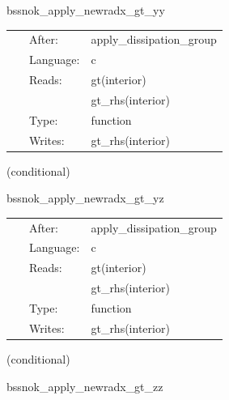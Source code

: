 \hspace{5mm} bssnok\_apply\_newradx\_gt\_yy 



\hspace{5mm}

 \begin{tabular*}{160mm}{cll} 
~ & After:  & apply\_dissipation\_group \\ 
~ & Language:  & c \\ 
~ & Reads:  & gt(interior) \\ 
~& ~ &gt\_rhs(interior)\\ 
~ & Type:  & function \\ 
~ & Writes:  & gt\_rhs(interior) \\ 
\end{tabular*} 


\vspace{5mm}

   (conditional) 

\hspace{5mm} bssnok\_apply\_newradx\_gt\_yz 



\hspace{5mm}

 \begin{tabular*}{160mm}{cll} 
~ & After:  & apply\_dissipation\_group \\ 
~ & Language:  & c \\ 
~ & Reads:  & gt(interior) \\ 
~& ~ &gt\_rhs(interior)\\ 
~ & Type:  & function \\ 
~ & Writes:  & gt\_rhs(interior) \\ 
\end{tabular*} 


\vspace{5mm}

   (conditional) 

\hspace{5mm} bssnok\_apply\_newradx\_gt\_zz 

